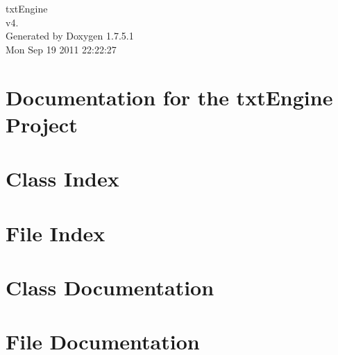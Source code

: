 \documentclass[a4paper]{book}
\begin{document}
\hypersetup{pageanchor=false,citecolor=blue}
\begin{titlepage}
\vspace*{7cm}
\begin{center}
{\Large txt\-Engine \\[1ex]\large v4. }\\
\vspace*{1cm}
{\large \-Generated by Doxygen 1.7.5.1}\\
\vspace*{0.5cm}
{\small Mon Sep 19 2011 22:22:27}\\
\end{center}
\end{titlepage}
\clearemptydoublepage
{}
\tableofcontents
\clearemptydoublepage
{}
\hypersetup{pageanchor=true,citecolor=blue}
\chapter{\-Documentation for the txt\-Engine \-Project}
\label{index}\hypertarget{index}{}
\chapter{\-Class \-Index}

\chapter{\-File \-Index}

\chapter{\-Class \-Documentation}







\chapter{\-File \-Documentation}


















\printindex
\end{document}
